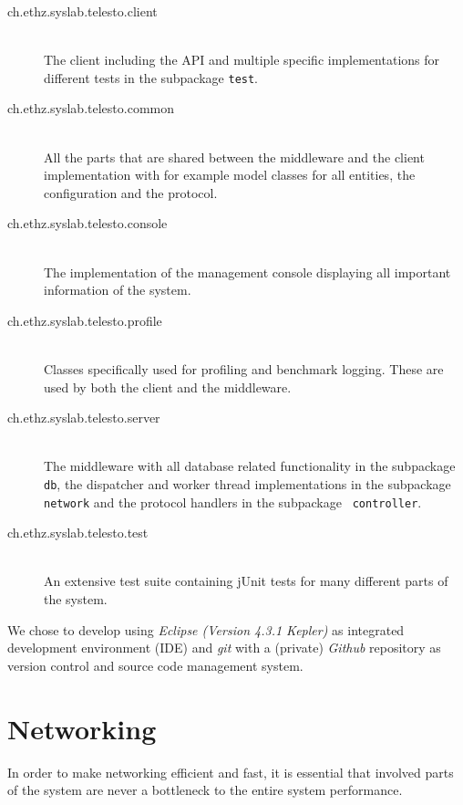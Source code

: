 \documentclass[a4paper, oneside]{csthesis}
\begin{document}
\begin{description}
\item[ch.ethz.syslab.telesto.client] \ \\
    The \telesto{} client including the API and multiple specific
    implementations for different tests in the subpackage {\tt test}.
\item[ch.ethz.syslab.telesto.common] \ \\
    All the parts that are shared between the middleware and the client
    implementation with for example model classes for all entities, the
    configuration and the protocol.
\item[ch.ethz.syslab.telesto.console] \ \\
    The implementation of the management console displaying all important
    information of the system.
\item[ch.ethz.syslab.telesto.profile] \ \\
    Classes specifically used for profiling and benchmark logging. These are
    used by both the client and the middleware.
\item[ch.ethz.syslab.telesto.server] \ \\
    The \telesto{} middleware with all database related functionality in the
    subpackage {\tt db}, the dispatcher and worker thread implementations in the
    subpackage {\tt network} and the protocol handlers in the subpackage {\tt
    controller}.
\item[ch.ethz.syslab.telesto.test] \ \\
    An extensive test suite containing jUnit tests for many different parts of
    the system.
\end{description}

We chose to develop \telesto{} using {\it Eclipse (Version 4.3.1
Kepler)}
as integrated development environment (IDE) and {\it
git}
with a (private) {\it Github} repository as version control
and source code management system.


\section{Networking}
    In order to make networking efficient and fast, it is essential that
    involved parts of the system are never a bottleneck to the entire system
    performance.
    
\end{document}
